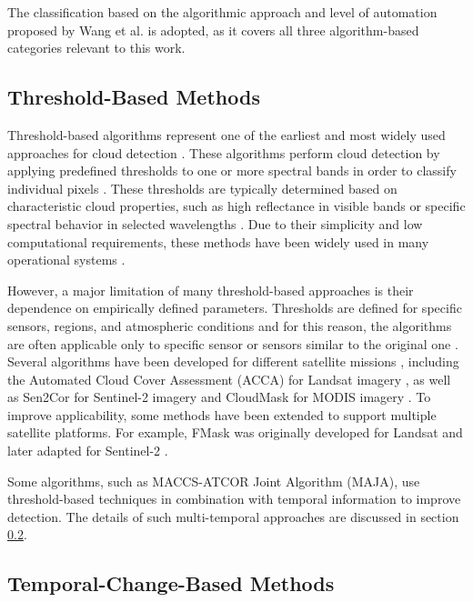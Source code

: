 The classification based on the algorithmic approach and level of automation proposed by Wang et al. \cite{wang2024} is adopted, as it covers all three algorithm-based categories relevant to this work.

\subsection{Threshold-Based Methods}

Threshold-based algorithms represent one of the earliest and most widely used approaches for cloud detection \cite{wang2024}. These algorithms perform cloud detection by applying predefined thresholds to one or more spectral bands in order to classify individual pixels \cite{zhiwei2022, singh2025}. These thresholds are typically determined based on characteristic cloud properties, such as high reflectance in visible bands or specific spectral behavior in selected wavelengths \cite{wang2024}. Due to their simplicity and low computational requirements, these methods have been widely used in many operational systems \cite{pesek2022}.

However, a major limitation of many threshold-based approaches is their dependence on empirically defined parameters. Thresholds are defined for specific sensors, regions, and atmospheric conditions and for this reason, the algorithms are often applicable only to specific sensor or sensors similar to the original one \cite{zhiwei2022}. Several algorithms have been developed for different satellite missions \cite{wang2024, pesek2022}, including the Automated Cloud Cover Assessment (ACCA) for Landsat imagery \cite{irish2000, irish2006}, as well as Sen2Cor for Sentinel-2 imagery \cite{knorn2017} and CloudMask for MODIS imagery \cite{ackerman1998}. To improve applicability, some methods have been extended to support multiple satellite platforms. For example, FMask was originally developed for Landsat \cite{zhu2012} and later adapted for Sentinel-2 \cite{zhu2015}. 

Some algorithms, such as MACCS-ATCOR Joint Algorithm (MAJA), use threshold-based techniques in combination with temporal information to improve detection. The details of such multi-temporal approaches are discussed in section \ref{sec:temporal_methods}.


\subsection{Temporal-Change-Based Methods}
\label{sec:temporal_methods}

